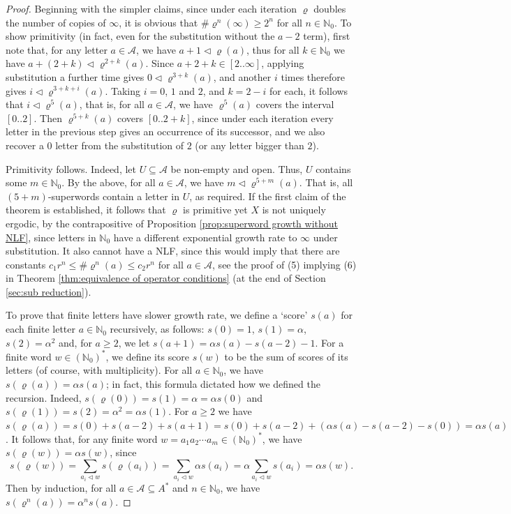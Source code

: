 \documentclass[11pt]{amsart}
\numberwithin{equation}{section}
\theoremstyle{plain}
\theoremstyle{definition}
\newcommand{\N}{{\mathbb N}}
\newcommand{\mc}{\mathcal}
\newcommand{\A}{\mc A}
\newcommand{\sub}{\varrho}
\begin{document}
\begin{proof}
Beginning with the simpler claims, since under each iteration \(\sub\) doubles the number of copies of \(\infty\), it is obvious that \(\# \sub^n(\infty) \geq 2^n\) for all \(n \in \N_0\). To show primitivity (in fact, even for the substitution without the \(a-2\) term), first note that, for any letter \(a \in \A\), we have \(a+1 \triangleleft \sub(a)\), thus for all \(k \in \N_0\) we have \(a+(2+k) \triangleleft \sub^{2+k}(a)\). Since \(a+2+k \in [2..\infty]\), applying substitution a further time gives \(0 \triangleleft \sub^{3+k}(a)\), and another \(i\) times therefore gives \(i \triangleleft \sub^{3+k+i}(a)\). Taking \(i = 0\), \(1\) and \(2\), and \(k = 2-i\) for each, it follows that \(i \triangleleft \sub^5(a)\), that is, for all \(a \in \A\), we have \(\sub^5(a)\) covers the interval \([0..2]\). Then \(\sub^{5+k}(a)\) covers \([0..2+k]\), since under each iteration every letter in the previous step gives an occurrence of its successor, and we also recover a \(0\) letter from the substitution of \(2\) (or any letter bigger than \(2\)).

Primitivity follows. Indeed, let \(U \subseteq \A\) be non-empty and open. Thus, \(U\) contains some \(m \in \N_0\). By the above, for all \(a \in \A\), we have \(m \triangleleft \sub^{5+m}(a)\). That is, all \((5+m)\)-superwords contain a letter in \(U\), as required. If the first claim of the theorem is established, it follows that \(\sub\) is primitive yet \(X\) is not uniquely ergodic, by the contrapositive of Proposition \ref{prop:superword growth without NLF}, since letters in \(\N_0\) have a different exponential growth rate to \(\infty\) under substitution. It also cannot have a NLF, since this would imply that there are constants \(c_1 r^n \leq \# \sub^n(a) \leq c_2 r^n\) for all \(a \in \A\), see the proof of (5) implying (6) in Theorem \ref{thm:equivalence of operator conditions} (at the end of Section \ref{sec:sub reduction}).

To prove that finite letters have slower growth rate, we define a `score' \(s(a)\) for each finite letter \(a \in \N_0\) recursively, as follows: \(s(0) = 1\), \(s(1) = \alpha\), \(s(2) = \alpha^2\) and, for \(a \geq 2\), we let \(s(a+1) = \alpha s(a) - s(a-2) - 1\). For a finite word \(w \in (\N_0)^\ast\), we define its score \(s(w)\) to be the sum of scores of its letters (of course, with multiplicity). For all \(a \in \N_0\), we have \(s(\sub(a)) = \alpha s(a)\); in fact, this formula dictated how we defined the recursion. Indeed, \(s(\sub(0)) = s(1) = \alpha = \alpha s(0)\) and \(s(\sub(1)) = s(2) = \alpha^2 = \alpha s(1)\). For \(a \geq 2\) we have \(s(\sub(a)) = s(0) + s(a-2) + s(a+1) = s(0) + s(a-2) + (\alpha s(a) - s(a-2) - s(0)) = \alpha s(a)\). It follows that, for any finite word \(w = a_1 a_2 \cdots a_m \in (\N_0)^\ast\), we have \(s(\sub(w)) = \alpha s(w)\), since
\[
s(\sub(w)) = \sum_{a_i \triangleleft w} s(\sub(a_i)) = \sum_{a_i \triangleleft w}  \alpha s(a_i) = \alpha \sum_{a_i \triangleleft w} s(a_i) = \alpha s(w) .
\]
Then by induction, for all \(a \in \A \subseteq A^\ast\) and \(n \in \N_0\), we have \(s(\sub^n(a)) = \alpha^n s(a)\).


\end{proof}
\end{document}
